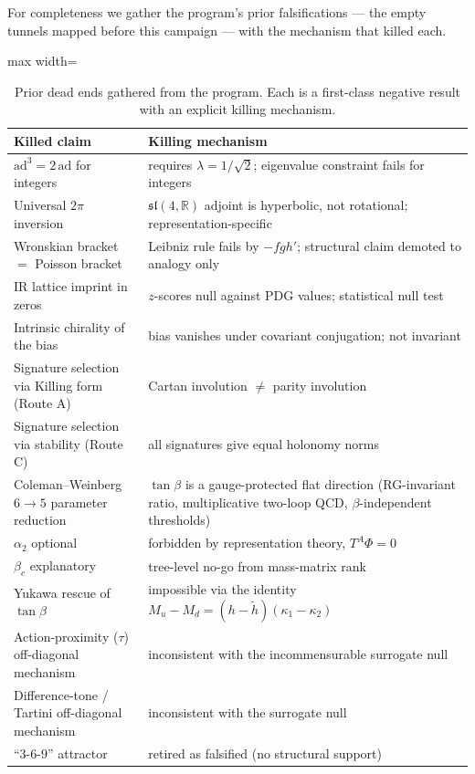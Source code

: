 \documentclass[11pt]{article}
\begin{document}
For completeness we gather the program's prior falsifications --- the empty tunnels
mapped before this campaign --- with the mechanism that killed each.

\begin{table}[h]
\centering
\small
\begin{adjustbox}{max width=\linewidth}\begin{tabular}{p{5.4cm}p{8.2cm}}
\toprule
Killed claim & Killing mechanism\\
\midrule
$\mathrm{ad}^3=2\,\mathrm{ad}$ for integers & requires $\lambda=1/\sqrt2$; eigenvalue constraint fails for integers\\
Universal $2\pi$ inversion & $\mathfrak{sl}(4,\mathbb{R})$ adjoint is hyperbolic, not rotational; representation-specific\\
Wronskian bracket $=$ Poisson bracket & Leibniz rule fails by $-fgh'$; structural claim demoted to analogy only\\
IR lattice imprint in zeros & $z$-scores null against PDG values; statistical null test\\
Intrinsic chirality of the bias & bias vanishes under covariant conjugation; not invariant\\
Signature selection via Killing form (Route A) & Cartan involution $\ne$ parity involution\\
Signature selection via stability (Route C) & all signatures give equal holonomy norms\\
Coleman--Weinberg $6\to5$ parameter reduction & $\tan\beta$ is a gauge-protected flat direction (RG-invariant ratio, multiplicative two-loop QCD, $\beta$-independent thresholds)\\
$\alpha_2$ optional & forbidden by representation theory, $T^A\Phi=0$\\
$\beta_c$ explanatory & tree-level no-go from mass-matrix rank\\
Yukawa rescue of $\tan\beta$ & impossible via the identity $M_u-M_d=(h-\tilde h)(\kappa_1-\kappa_2)$\\
Action-proximity ($\tau$) off-diagonal mechanism & inconsistent with the incommensurable surrogate null\\
Difference-tone / Tartini off-diagonal mechanism & inconsistent with the surrogate null\\
``$3$-$6$-$9$'' attractor & retired as falsified (no structural support)\\
\bottomrule
\end{tabular}\end{adjustbox}
\caption{Prior dead ends gathered from the program. Each is a first-class negative
result with an explicit killing mechanism.}
\label{tab:deadends}
\end{table}
\end{document}
